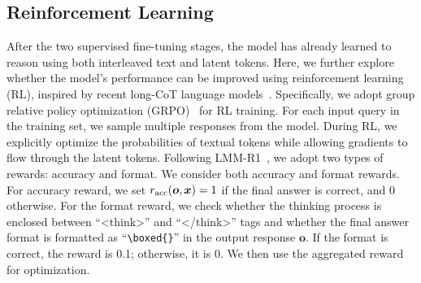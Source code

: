 \subsection{Reinforcement Learning}
After the two supervised fine-tuning stages, the model has already learned to reason using both interleaved text and latent tokens. Here, we further explore whether the model's performance can be improved using reinforcement learning (RL), inspired by recent long-CoT language models~\citep{xie2025teaching,shen2025satori}. Specifically, we adopt group relative policy optimization (GRPO)~\citep{shao2024deepseekmath} for RL training. For each input query in the training set, we sample multiple responses from the model. During RL, we explicitly optimize the probabilities of textual tokens while allowing gradients to flow through the latent tokens. Following LMM-R1~\citep{peng2025lmm}, we adopt two types of rewards: accuracy and format. We consider both accuracy and format rewards. For accuracy reward, we set $r_{\rm acc}( \bm o, \bm x) = 1$ if the final answer is correct, and $0$ otherwise. For the format reward, we check whether the thinking process is enclosed between ``<think>'' and ``</think>'' tags and whether the final answer format is formatted as ``\texttt{\textbackslash boxed\{\}}'' in the output response $\bm o$. If the format is correct, the reward is 0.1; otherwise, it is 0. We then use the aggregated reward for optimization.




